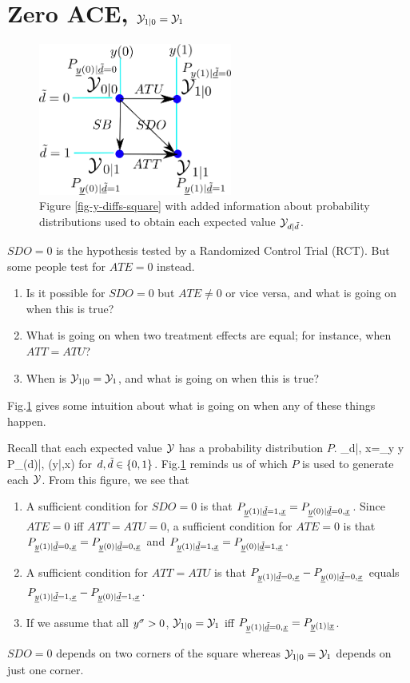 \section{Zero ACE, ${\cal Y}_{1|0}={\cal Y}_{1}$}
\label{sec-td-ignored}

\begin{figure}[h!]
\centering
\includegraphics[width=2.5in]
{pot-out/y-diffs-square-probs.png}
\caption{Figure \ref{fig-y-diffs-square} 
with added information
about  probability distributions 
used to obtain each expected value ${\cal Y}_{d|{\tilde{d}}}$.}
\label{fig-y-diffs-square-probs}
\end{figure}

$SDO=0$
is the hypothesis 
tested by a Randomized Control Trial (RCT).
But some people
test for $ATE=0$
instead.
\begin{enumerate}
\item 
Is it
possible for $SDO=0$ but $ATE\neq 0$
or vice versa, and
what is going on when this is true?
\item
What is going on when two treatment effects
are equal; for instance, when $ATT=ATU$?
\item
When is ${\cal Y}_{1|0}={\cal Y}_{1}$,
and what is going on when this is  true?
\end{enumerate}
Fig.\ref{fig-y-diffs-square-probs}
gives some 
intuition 
about what is
going on when any of these 
things happen.

Recall that
each expected value ${\cal Y}$ has a probability
distribution $P$.
\beq
\caly_{d|\td, x}=\sum_{y} y P_{\rvy(d)|\rvtd, \rvx}(y|\td,x)
\eeq
for $d, {\tilde{d}}\in \{0,1\}$.
Fig.\ref{fig-y-diffs-square-probs}
reminds us of which $P$
is used to generate each ${\cal Y}$.
From this figure, we see that

\begin{enumerate}
\item
A sufficient
condition for $SDO=0$
is that 
$P_{{\underline{y}}(1)|{\underline{\tilde{d}}}=1, {\underline{x}}}
=
P_{{\underline{y}}(0)|{\underline{\tilde{d}}}=0, {\underline{x}}}$.
Since $ATE=0$ iff 
$ATT=ATU=0$,
a sufficient condition
for $ATE=0$ is that
$P_{{\underline{y}}(1)|{\underline{\tilde{d}}}=0, {\underline{x}}}
=
P_{{\underline{y}}(0)|{\underline{\tilde{d}}}=0, {\underline{x}}}$
and
$P_{{\underline{y}}(1)|{\underline{\tilde{d}}}=1, {\underline{x}}}
=
P_{{\underline{y}}(0)|{\underline{\tilde{d}}}=1, {\underline{x}}}$.
\item
A sufficient condition for
$ATT=ATU$
is that 
$P_{{\underline{y}}(1)|{\underline{\tilde{d}}}=0, {\underline{x}}}
-
P_{{\underline{y}}(0)|{\underline{\tilde{d}}}=0, {\underline{x}}}$
equals
$P_{{\underline{y}}(1)|{\underline{\tilde{d}}}=1, {\underline{x}}}
-
P_{{\underline{y}}(0)|{\underline{\tilde{d}}}=1, {\underline{x}}}$.
\item
If we assume that
all $y^\sigma>0$, ${\cal Y}_{1|0}={\cal Y}_{1}$
iff 
$P_{{\underline{y}}(1)|{\underline{\tilde{d}}}=0, {\underline{x}}}=
P_{{\underline{y}}(1)| {\underline{x}}}$.
\end{enumerate}
$SDO=0$
depends on two corners
of the square
whereas  ${\cal Y}_{1|0}={\cal Y}_{1}$
depends on just one corner.


